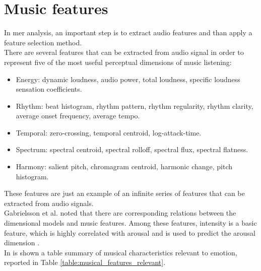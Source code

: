 \section{Music features}\label{music_features}
In \gls{mer} analysis, an important step is to extract audio features and than apply a feature selection method.
\\
There are several features that can be extracted from audio signal in order to represent five of the most useful perceptual dimensions of music listening:
\begin{itemize}
	\item Energy: dynamic loudness, audio power, total loudness, specific loudness sensation coefficients.
	\item Rhythm: beat histogram, rhythm pattern, rhythm regularity, rhythm clarity, average onset frequency, average tempo.
	\item Temporal: zero-crossing, temporal centroid, log-attack-time.
	\item Spectrum: spectral centroid, spectral rolloff, spectral flux, spectral flatness.
	\item Harmony: salient pitch, chromagram centroid, harmonic change, pitch histogram.
\end{itemize}
These features are just an example of an infinite series of features that can be extracted from audio signals.
\\ \indent
Gabrielsson et al. \cite{gabrielsson2001influence} noted that there are corresponding relations between the dimensional models and music features. Among these features, intensity is a basic feature, which is highly correlated with arousal and is used to predict the arousal dimension \cite{zhang2017feature}.
\\
In \cite{panda2018novel} is shown a table summary of musical characteristics relevant to emotion, reported in Table \ref{table:musical_features_relevant}.
